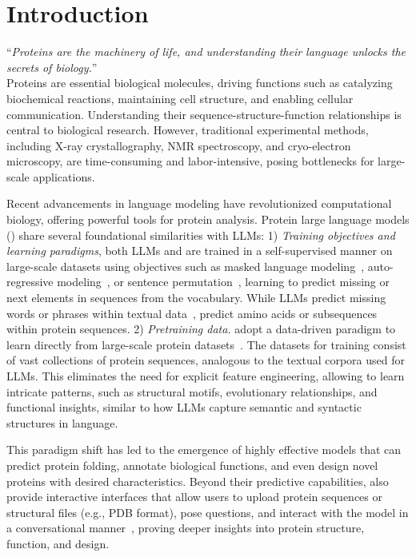 \section{Introduction}

``\textit{Proteins are the machinery of life, and understanding their language unlocks the secrets of biology.}''
\\

Proteins are essential biological molecules, driving functions such as catalyzing biochemical reactions, maintaining cell structure, and enabling cellular communication. Understanding their sequence-structure-function relationships is central to biological research. However, traditional experimental methods, including X-ray crystallography, NMR spectroscopy, and cryo-electron microscopy, are time-consuming and labor-intensive, posing bottlenecks for large-scale applications.

Recent advancements in language modeling have revolutionized computational biology, offering powerful tools for protein analysis. Protein large language models (\textbf{\proteinllms}) share several foundational similarities with LLMs: 1) \emph{Training objectives and learning paradigms}, both LLMs and \proteinllms are trained in a self-supervised manner on large-scale datasets using objectives such as masked language modeling~\cite{devlin2019bert},  auto-regressive modeling~\cite{luo2022biogpt}, or sentence permutation~\cite{lewis2019bart, yuan2022biobart}, learning to predict missing or next elements in sequences from the vocabulary. While LLMs predict missing words or phrases within textual data~\cite{reimers2019sentence, liu2019roberta, touvron2023llama}, \proteinllms predict amino acids or subsequences within protein sequences. 2) \emph{Pretraining data.} \proteinllms adopt a data-driven paradigm to learn directly from large-scale protein datasets~\cite{liu2024timemattersexaminetemporal, jones2024examiningimbalanceeffectsperformance}. The datasets for training \proteinllms consist of vast collections of protein sequences, analogous to the textual corpora used for LLMs. This eliminates the need for explicit feature engineering, allowing \proteinllms to learn intricate patterns, such as structural motifs, evolutionary relationships, and functional insights, similar to how LLMs capture semantic and syntactic structures in language.

This paradigm shift has led to the emergence of highly effective models that can predict protein folding, annotate biological functions, and even design novel proteins with desired characteristics. Beyond their predictive capabilities, \proteinllms also provide interactive interfaces that allow users to upload protein sequences or structural files (e.g., PDB format), pose questions, and interact with the model in a conversational manner~\cite{liu2024prott3,xiao2024proteingpt}, proving deeper insights into protein structure, function, and design.

